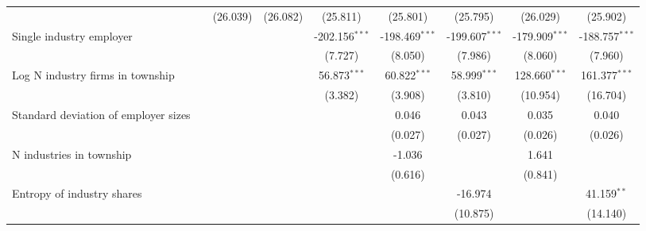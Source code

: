 \begin{tabular}{lcccccccc}
                                                         &                 & (26.039)        & (26.082)        & (25.811)         & (25.801)         & (25.795)         & (26.029)         & (25.902)\\   
   Single industry employer                              &                 &                 &                 & -202.156$^{***}$ & -198.469$^{***}$ & -199.607$^{***}$ & -179.909$^{***}$ & -188.757$^{***}$\\   
                                                         &                 &                 &                 & (7.727)          & (8.050)          & (7.986)          & (8.060)          & (7.960)\\   
   Log N industry firms in township                      &                 &                 &                 & 56.873$^{***}$   & 60.822$^{***}$   & 58.999$^{***}$   & 128.660$^{***}$  & 161.377$^{***}$\\   
                                                         &                 &                 &                 & (3.382)          & (3.908)          & (3.810)          & (10.954)         & (16.704)\\   
   Standard deviation of employer sizes                  &                 &                 &                 &                  & 0.046            & 0.043            & 0.035            & 0.040\\   
                                                         &                 &                 &                 &                  & (0.027)          & (0.027)          & (0.026)          & (0.026)\\   
   N industries in township                              &                 &                 &                 &                  & -1.036           &                  & 1.641            &   \\   
                                                         &                 &                 &                 &                  & (0.616)          &                  & (0.841)          &   \\   
   Entropy of industry shares                            &                 &                 &                 &                  &                  & -16.974          &                  & 41.159$^{**}$\\   
                                                         &                 &                 &                 &                  &                  & (10.875)         &                  & (14.140)\\   

\end{tabular}
